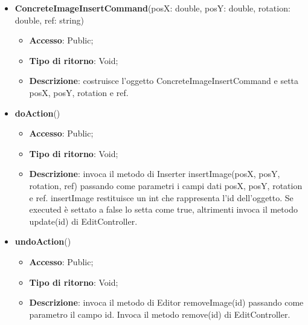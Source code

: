 {{{	
	\begin{itemize}
		\item \textbf{ConcreteImageInsertCommand}(posX: double, posY: double, rotation: double, ref: string)
		\begin{itemize}
			\item \textbf{Accesso}: Public;
			\item \textbf{Tipo di ritorno}: Void;
			\item \textbf{Descrizione}: costruisce l’oggetto ConcreteImageInsertCommand e setta posX, posY, rotation e ref.
		\end{itemize}
		\item \textbf{doAction}()
		\begin{itemize}
			\item \textbf{Accesso}: Public;
			\item \textbf{Tipo di ritorno}: Void;
			\item \textbf{Descrizione}: invoca il metodo di Inserter insertImage(posX, posY, rotation, ref) passando come parametri i  campi dati posX, posY, rotation e ref. insertImage restituisce un int che rappresenta l’id dell’oggetto. Se executed è settato a false lo setta come true, altrimenti invoca il metodo update(id) di EditController.
		\end{itemize}
		\item \textbf{undoAction}()
		\begin{itemize}
			\item \textbf{Accesso}: Public;
			\item \textbf{Tipo di ritorno}: Void;
			\item \textbf{Descrizione}: invoca il metodo di Editor removeImage(id) passando come parametro il campo id. Invoca il metodo remove(id) di EditController.
		\end{itemize}
	\end{itemize}
	}
}}
